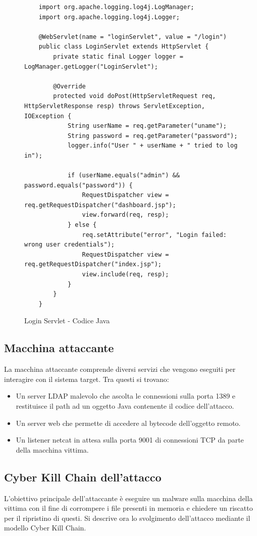 \documentclass[a4paper, 12pt]{article}
\begin{document}
\begin{figure}
    \centering
    \begin{lstlisting}
    import org.apache.logging.log4j.LogManager;
    import org.apache.logging.log4j.Logger;
    
    @WebServlet(name = "loginServlet", value = "/login")
    public class LoginServlet extends HttpServlet {
        private static final Logger logger = LogManager.getLogger("LoginServlet");
    
        @Override
        protected void doPost(HttpServletRequest req, HttpServletResponse resp) throws ServletException, IOException {
            String userName = req.getParameter("uname");
            String password = req.getParameter("password");
            logger.info("User " + userName + " tried to log in");
    
            if (userName.equals("admin") && password.equals("password")) {
                RequestDispatcher view = req.getRequestDispatcher("dashboard.jsp");
                view.forward(req, resp);
            } else {
                req.setAttribute("error", "Login failed: wrong user credentials");
                RequestDispatcher view = req.getRequestDispatcher("index.jsp");
                view.include(req, resp);
            }
        }
    }
\end{lstlisting}
    \caption{Login Servlet - Codice Java}
    \label{fig:loginservlet}
\end{figure}


\subsection{Macchina attaccante}
La macchina attaccante comprende diversi servizi che vengono eseguiti per interagire con il sistema target. Tra questi si trovano:
\begin{itemize}
    \item Un server LDAP malevolo che ascolta le connessioni sulla porta 1389 e restituisce il path ad un oggetto Java contenente il codice dell'attacco.
    \item Un server web che permette di accedere al bytecode dell'oggetto remoto.
    \item Un listener netcat in attesa sulla porta 9001 di connessioni TCP da parte della macchina vittima.
\end{itemize}


\subsection{Cyber Kill Chain dell'attacco}
L'obiettivo principale dell'attaccante è eseguire un malware sulla macchina della vittima con il fine di corrompere i file presenti in memoria e chiedere un riscatto per il ripristino di questi.
Si descrive ora lo svolgimento dell'attacco mediante il modello Cyber Kill Chain.
\end{document}
